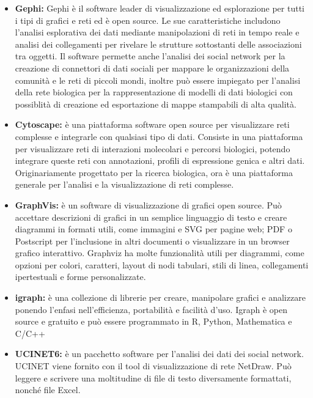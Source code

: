 \documentclass[binding=0.6cm]{sapthesis}
\begin{document}
\begin{itemize}
  \item \textbf{Gephi\cite{Gephi2024}:}
  Gephi è il software leader di visualizzazione ed esplorazione per tutti i tipi di grafici e reti ed è open source. 
  Le sue caratteristiche includono
  l'analisi esplorativa dei dati mediante manipolazioni di reti in tempo reale e
  analisi dei collegamenti per rivelare le strutture sottostanti delle associazioni
  tra oggetti. Il software permette anche l'analisi dei social network per la creazione di connettori di dati
  sociali per mappare le organizzazioni della comunità e le reti di piccoli mondi, inoltre può essere impiegato per 
  l'analisi della rete biologica per la rappresentazione di modelli di dati biologici con possiblità di
  creazione ed esportazione di mappe stampabili di alta qualità.
  \item \textbf{Cytoscape\cite{Cytoscape2024}:} è una piattaforma software open source per visualizzare 
  reti complesse e integrarle con qualsiasi tipo di dati. Consiste in una piattaforma per
  visualizzare reti di interazioni molecolari e percorsi biologici, potendo integrare queste reti con annotazioni,
  profili di espressione genica e altri dati. Originariamente progettato per la ricerca biologica, 
  ora è una piattaforma generale per l'analisi e la visualizzazione di reti complesse.
  \item \textbf{GraphVis\cite{Graphviz2024}:} è un software di visualizzazione di grafici open source. Può accettare descrizioni di grafici in un semplice linguaggio di testo e creare diagrammi in formati utili, 
  come immagini e SVG per pagine web; PDF o Postscript per l'inclusione in altri documenti 
  o visualizzare in un browser grafico interattivo. Graphviz ha molte funzionalità utili 
  per diagrammi, come opzioni per colori, caratteri, layout di nodi tabulari, stili di linea, 
  collegamenti ipertestuali e forme personalizzate.
  \item \textbf{igraph\cite{igraph2024}:} è una collezione di librerie per creare, manipolare grafici e analizzare ponendo l'enfasi nell'efficienza,
  portabilità e facilità d'uso. Igraph è open source e gratuito e può essere programmato in R, Python, Mathematica e C/C++
  \item \textbf{UCINET6\cite{UCINET2024}:} è un pacchetto software per l'analisi dei dati dei social network. UCINET viene fornito con il tool di visualizzazione di rete NetDraw.
  Può leggere e scrivere una moltitudine di file di testo diversamente formattati, nonché file Excel. 

\end{itemize}
\end{document}
